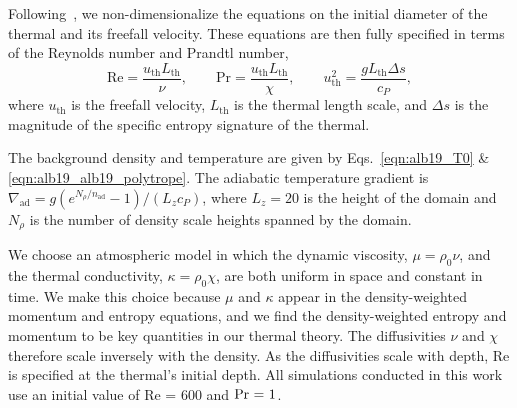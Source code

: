 Following \LJ\,, we non-dimensionalize the equations on the initial diameter of the thermal and its freefall velocity.
These equations are then fully specified in terms of the Reynolds number and Prandtl number,
\begin{equation}
\text{Re} = \frac{ u_{\text{th}} L_{\text{th}}}{\nu}, \qquad
\text{Pr} = \frac{ u_{\text{th}} L_{\text{th}}}{\chi}, \qquad
u_{\text{th}}^2 = \frac{g L_{\text{th}} \Delta s}{c_P},
\end{equation}
where $u_{\text{th}}$ is the freefall velocity, $L_{\text{th}}$ is the thermal length scale, and
$\Delta s$ is the magnitude of the specific entropy signature of the thermal.

The background density and temperature are given by Eqs.~\ref{eqn:alb19_T0} \& \ref{eqn:alb19_alb19_polytrope}.
The adiabatic temperature gradient is $\nabla_{\text{ad}}=g(e^{N_\rho/n_{\text{ad}}}-1)/(L_z c_P)$, where $L_z=20$ is the height of the domain and $N_\rho$ is the number of density scale heights spanned by the domain.

We choose an atmospheric model in which the dynamic viscosity, $\mu = \rho_0 \nu$, and the thermal conductivity, $\kappa = \rho_0 \chi$, are both uniform in space and constant in time.
We make this choice because $\mu$ and $\kappa$ appear in the density-weighted momentum and entropy equations, and we find the density-weighted entropy and momentum to be key quantities in our thermal theory.
The diffusivities $\nu$ and $\chi$ therefore scale inversely with the density.
As the diffusivities scale with depth, Re is specified at the thermal's initial depth.
All simulations conducted in this work use an initial value of Re = 600 and $\mbox{\text{Pr} = 1}$.

